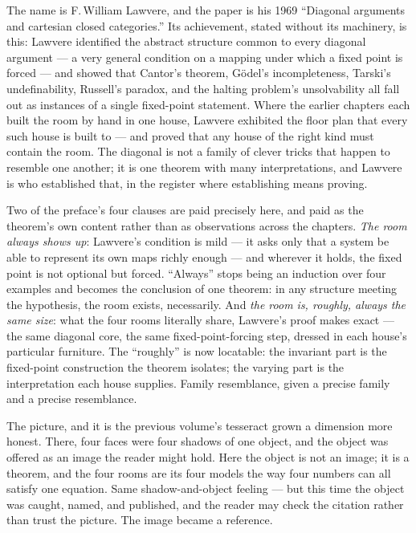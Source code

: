 The name is F.\,William Lawvere, and the paper is his 1969 ``Diagonal
arguments and cartesian closed categories.'' Its achievement, stated
without its machinery, is this: Lawvere identified the abstract structure
common to every diagonal argument --- a very general condition on a
mapping under which a fixed point is forced --- and showed that Cantor's
theorem, G\"odel's incompleteness, Tarski's undefinability, Russell's
paradox, and the halting problem's unsolvability all fall out as instances
of a single fixed-point statement. Where the earlier chapters each built
the room by hand in one house, Lawvere exhibited the floor plan that every
such house is built to --- and proved that any house of the right kind
must contain the room. The diagonal is not a family of clever tricks that
happen to resemble one another; it is one theorem with many
interpretations, and Lawvere is who established that, in the register where
establishing means proving.

Two of the preface's four clauses are paid precisely here, and paid as the
theorem's own content rather than as observations across the chapters.
\emph{The room always shows up}: Lawvere's condition is mild --- it asks
only that a system be able to represent its own maps richly enough --- and
wherever it holds, the fixed point is not optional but forced. ``Always''
stops being an induction over four examples and becomes the conclusion of
one theorem: in any structure meeting the hypothesis, the room exists,
necessarily. And \emph{the room is, roughly, always the same size}: what
the four rooms literally share, Lawvere's proof makes exact --- the same
diagonal core, the same fixed-point-forcing step, dressed in each house's
particular furniture. The ``roughly'' is now locatable: the invariant part
is the fixed-point construction the theorem isolates; the varying part is
the interpretation each house supplies. Family resemblance, given a
precise family and a precise resemblance.

\begin{intuition}
The picture, and it is the previous volume's tesseract grown a dimension
more honest. There, four faces were four shadows of one object, and the
object was offered as an image the reader might hold. Here the object is
not an image; it is a theorem, and the four rooms are its four models the
way four numbers can all satisfy one equation. Same shadow-and-object
feeling --- but this time the object was caught, named, and published, and
the reader may check the citation rather than trust the picture. The
image became a reference.
\end{intuition}


